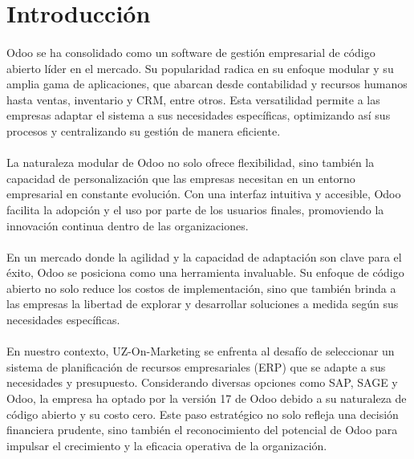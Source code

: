 \section{Introducción}
\paragraph{}
Odoo se ha consolidado como un software de gestión empresarial de código abierto líder en el mercado. Su popularidad radica en su enfoque modular y su amplia gama de aplicaciones, que abarcan desde contabilidad y recursos humanos hasta ventas, inventario y CRM, entre otros. Esta versatilidad permite a las empresas adaptar el sistema a sus necesidades específicas, optimizando así sus procesos y centralizando su gestión de manera eficiente.
\paragraph{}
La naturaleza modular de Odoo no solo ofrece flexibilidad, sino también la capacidad de personalización que las empresas necesitan en un entorno empresarial en constante evolución. Con una interfaz intuitiva y accesible, Odoo facilita la adopción y el uso por parte de los usuarios finales, promoviendo la innovación continua dentro de las organizaciones.
\paragraph{}
En un mercado donde la agilidad y la capacidad de adaptación son clave para el éxito, Odoo se posiciona como una herramienta invaluable. Su enfoque de código abierto no solo reduce los costos de implementación, sino que también brinda a las empresas la libertad de explorar y desarrollar soluciones a medida según sus necesidades específicas.
\paragraph{}
En nuestro contexto, UZ-On-Marketing se enfrenta al desafío de seleccionar un sistema de planificación de recursos empresariales (ERP) que se adapte a sus necesidades y presupuesto. Considerando diversas opciones como SAP, SAGE y Odoo, la empresa ha optado por la versión 17 de Odoo debido a su naturaleza de código abierto y su costo cero. Este paso estratégico no solo refleja una decisión financiera prudente, sino también el reconocimiento del potencial de Odoo para impulsar el crecimiento y la eficacia operativa de la organización.